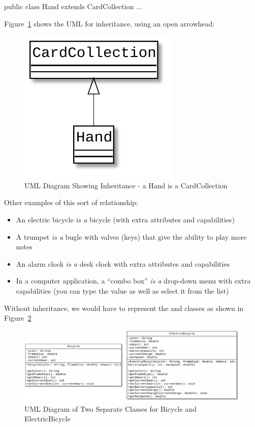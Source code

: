 \begin{code}
public class Hand extends CardCollection {
   ...
}
\end{code}

Figure~\ref{fig.simpleInheritance} shows the UML for inheritance, using an open arrowhead:

\begin{figure}[!h]
\begin{center}
\includegraphics[scale=0.75]{figs/ch14/inheritance.pdf}
\caption{UML Diagram Showing Inheritance - a Hand is a CardCollection}
\label{fig.simpleInheritance}
\end{center}
\end{figure}

Other examples of this sort of relationship:

\begin{itemize}
\item An electric bicycle {\em is a} bicycle (with extra attributes and capabilities)
\item A trumpet {\em is a} bugle with valves (keys) that give the ability to play more notes
\item An alarm clock {\em is a} desk clock with extra attributes and capabilities
\item In a computer application, a ``combo box'' {\em is a} drop-down menu with extra capabilities (you can type the value as well as select it from the list)
\end{itemize}

Without inheritance, we would have to represent the  and  classes as shown in Figure~\ref{fig.nonInheritedBikes}

\begin{figure}[!h]
\begin{center}
\includegraphics[scale=0.3]{figs/ch14/non_inherited_bikes.pdf}
\caption{UML Diagram of Two Separate Classes for Bicycle and ElectricBicycle}
\label{fig.nonInheritedBikes}
\end{center}
\end{figure}

